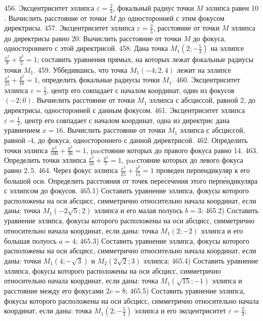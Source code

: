 456. Эксцентриситет эллипса $\varepsilon=\frac{2}{3}$, фокальный радиус точки $M$ эллипса равен 10 . Вычислить расстояние от точки $M$ до односторонней с этим фокусом директрисы.
457. Эксцентриситет эллипса $\varepsilon=\frac{2}{5}$, расстояние от точки $M$ эллипса до директрисы равно 20. Вычислить расстояние от точки $M$ до фокуса, одностороннего с этой директрисой.
458. Дана точка $M_1\left(2 ;-\frac{5}{3}\right)$ на эллипсе $\frac{x^2}{9}+\frac{y^2}{5}=1$; составить уравнения прямых, на которых лежат фокальные радиусы точки $M_1$.
459. Уббедившись, что точка $M_1(-4 ; 2,4)$ лежит на эллипсе $\frac{x^2}{25}+\frac{y^2}{16}=1$, определить фокальные радиусы точки $M_1$.
460. Эксцентриситет эллипса $\varepsilon=\frac{1}{3}$, центр его совпадает с началом координат, один из фокусов $(-2 ; 0)$. Вычиелить расстояние от точки $M_1$ эллипса с абсциссой, равной 2, до директрисы, односторонней с данным фокусом.
461. Эксцентриситет эллипса $\varepsilon=\frac{1}{2}$, центр его совпадает с началом координат, одна из директрис дана уравнением $x=16$. Вычислить расстояние от точки $M_1$ эллипса с абсциссой, равной -4, до фокуса, одностороннего с данной директрисой.
462. Определить точки эллипса $\frac{x^2}{100}+\frac{y^2}{36}=1$, pacстояние которых до правого фокуса равно 14.
463. Определить точки эллипса $\frac{x^2}{16}+\frac{y^2}{7}=1$, pacстояние которых до левого фокуса равно $2,5$.
464. Через фокус эллипса $\frac{x^2}{25}+\frac{y^2}{15}=1$ проведен перпендикуляр к его большой оси. Определить расстояния от точек пересечения этого перпе́ндикуляра с эллипсом до фокусов.
465.1) Составить уравнение эллипса, фокусы которого расположены на оси абсцисс, симметрично относительно начала координат, если даны: точка $M_1(-2 \sqrt{5} ; 2)$ эллипса и его малая полуось $b=3$;
465.2) Составить уравнение эллипса, фокусы которого расположены на оси абсцисс, симметрично относительно начала координат, если даны: точка $M_1(2 ;-2)$ эллипса и его большая полуось $a=4$;
465.3) Составить уравнение эллипса, фокусы которого расположены на оси абсцисс, симметрично относительно начала координат, если даны: точки $M_1(4 ;-\sqrt{3})$ и $M_2(2 \sqrt{2} ; 3)$ эллипса;
465.4) Составить уравнение эллипса, фокусы которого расположены на оси абсцисс, симметрично относительно начала координат, если даны: точка $M_1(\sqrt{15} ;-1)$ эллипса и расстояние между его фокусами $2 c=8$;
465.5) Составить уравнение эллипса, фокусы которого расположены на оси абсцисс, симметрично относительно начала координат, если даны: точка $M_1\left(2 ;-\frac{5}{3}\right)$ эллипса и его эксцентриситет $\varepsilon=\frac{2}{3}$;
